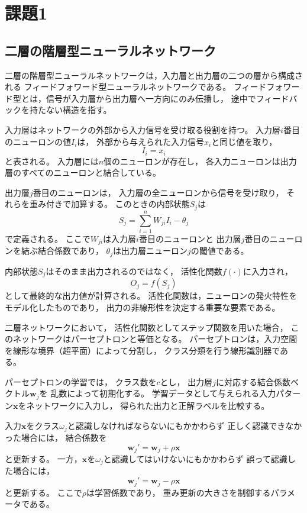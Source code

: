 \section{課題1}

\subsection{二層の階層型ニューラルネットワーク}

二層の階層型ニューラルネットワークは，入力層と出力層の二つの層から構成される
フィードフォワード型ニューラルネットワークである。
フィードフォワード型とは，信号が入力層から出力層へ一方向にのみ伝播し，
途中でフィードバックを持たない構造を指す。

入力層はネットワークの外部から入力信号を受け取る役割を持つ。
入力層$i$番目のニューロンの値$I_i$は，
外部から与えられた入力信号$x_i$と同じ値を取り，
\[
I_i = x_i
\]
と表される。
入力層には$n$個のニューロンが存在し，
各入力ニューロンは出力層のすべてのニューロンと結合している。

出力層$j$番目のニューロンは，
入力層の全ニューロンから信号を受け取り，
それらを重み付きで加算する。
このときの内部状態$S_j$は
\[
S_j = \sum_{i=1}^{n} W_{ji} I_i - \theta_j
\]
で定義される。
ここで$W_{ji}$は入力層$i$番目のニューロンと
出力層$j$番目のニューロンを結ぶ結合係数であり，
$\theta_j$は出力層ニューロン$j$の閾値である。

内部状態$S_j$はそのまま出力されるのではなく，
活性化関数$f(\cdot)$に入力され，
\[
O_j = f(S_j)
\]
として最終的な出力値が計算される。
活性化関数は，ニューロンの発火特性をモデル化したものであり，
出力の非線形性を決定する重要な要素である。

二層ネットワークにおいて，
活性化関数としてステップ関数を用いた場合，
このネットワークはパーセプトロンと等価となる。
パーセプトロンは，入力空間を線形な境界（超平面）によって分割し，
クラス分類を行う線形識別器である。

パーセプトロンの学習では，
クラス数を$c$とし，
出力層$j$に対応する結合係数ベクトル$\mathbf{w}_j$を
乱数によって初期化する。
学習データとして与えられる入力パターン$\mathbf{x}$をネットワークに入力し，
得られた出力と正解ラベルを比較する。

入力$\mathbf{x}$をクラス$\omega_j$と認識しなければならないにもかかわらず
正しく認識できなかった場合には，
結合係数を
\[
\mathbf{w}_j' = \mathbf{w}_j + \rho \mathbf{x}
\]
と更新する。
一方，$\mathbf{x}$を$\omega_j$と認識してはいけないにもかかわらず
誤って認識した場合には，
\[
\mathbf{w}_j' = \mathbf{w}_j - \rho \mathbf{x}
\]
と更新する。
ここで$\rho$は学習係数であり，
重み更新の大きさを制御するパラメータである。

